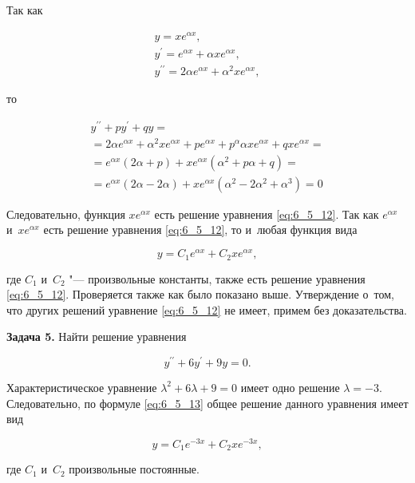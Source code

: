 Так как

\begin{gather*}
y = xe^{\alpha x}, \\
y^\prime = e^{\alpha x} + \alpha x e^{\alpha x}, \\
y^{\prime\prime} = 2\alpha e^{\alpha x} + \alpha^{2} xe^{\alpha x},
\end{gather*}

\noindent
то

\begin{multline*}
y^{\prime\prime} + py^\prime + qy = \\
= 2\alpha e^{\alpha x} + \alpha^{2}xe^{\alpha x} + pe^{\alpha x} +
p^{\alpha} \alpha xe^{\alpha x} + qxe^{\alpha x} = \\
= e^{\alpha x}(2\alpha + p) + xe^{\alpha x} \left( \alpha^{2} + p\alpha + q \right) = \\
= e^{\alpha x}(2\alpha - 2\alpha) + xe^{\alpha x}
  \left( \alpha^{2} - 2\alpha^{2} + \alpha^{3} \right)
= 0 
\end{multline*}

Следовательно, функция $xe^{\alpha x}$ есть решение уравнения \eqref{eq:6_5_12}.
Так как $e^{\alpha x}$ и~$x e^{\alpha x}$ есть решение уравнения \eqref{eq:6_5_12},
то и~любая функция вида

\begin{equation}\label{eq:6_5_13}
y = C_{1}e^{\alpha x} + C_{2} xe^{\alpha x},
\end{equation}

\noindent
где $C_{1}$ и~$C_{2}$ "--- произвольные константы, также есть решение уравнения
\eqref{eq:6_5_12}. Проверяется также как было показано выше.
Утверждение о~том, что других решений уравнение \eqref{eq:6_5_12} не имеет,
примем без доказательства.

\textbf{Задача 5.}\label{ex:6_5_5} Найти решение уравнения

\begin{equation*}
y^{\prime\prime} + 6y^\prime + 9y = 0.
\end{equation*}

Характеристическое уравнение $\lambda^{2} + 6\lambda + 9 = 0$ имеет одно
решение $\lambda = -3$. Следовательно, по формуле \eqref{eq:6_5_13} общее
решение данного уравнения имеет вид

\begin{equation*}
y = C_{1}e^{-3x} + C_{2}xe^{-3x},
\end{equation*}

\noindent
где $C_{1}$ и~$C_{2}$ произвольные постоянные.


